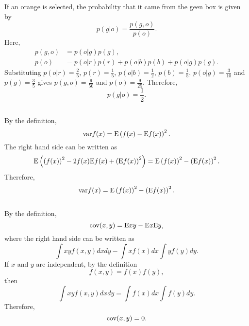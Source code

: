 If an orange is selected, the probability that it came from the geen box is given by
%
\begin{equation}
p(g | o) = \frac{p(g, o)}{p(o)}.
\end{equation}
%
Here,
%
\begin{equation}
\begin{aligned}
p(g, o) &= p(o | g) p(g), \\
p(o) & = p(o | r) p(r) + p(o | b) p(b) + p(o | g) p(g).
\end{aligned}
\end{equation}
%
Substituting $p(o | r) = \frac{2}{5}$, $p(r) = \frac{1}{5}$, $p(o | b) = \frac{1}{2}$, $p(b) = \frac{1}{5}$, $p(o | g) = \frac{3}{10}$ and $p(g) = \frac{3}{5}$ gives $p(g, o) = \frac{9}{50}$ and $p(o) = \frac{9}{25}$.
%
Therefore,
\begin{equation}
p(g | o) = \frac{1}{2}.
\end{equation}




\subsection{}
By the definition, 
%
\begin{equation}
{\rm var} f(x) = {\rm E} \left( f(x) - {\rm E} f(x) \right) ^ 2.
\end{equation}
%
The right hand side can be written as 
%
\begin{equation}
{\rm E} \left( \left( f(x) \right) ^ 2 - 2 f(x) {\rm E} f(x) + \left( {\rm E} f(x) \right) ^ 2 \right) = {\rm E} \left( f(x) \right) ^ 2 - \left( {\rm E} f(x) \right) ^ 2.
\end{equation}
%
Therefore, 
%
\begin{equation}
{\rm var} f(x) = {\rm E} \left( f(x) \right) ^ 2 - \left( {\rm E} f(x) \right) ^ 2.
\end{equation}
%


\subsection{}
By the definition,
%
\begin{equation}
{\rm cov} (x, y) = {\rm E} xy - {\rm E} x {\rm E} y,
\end{equation}
%
where the right hand side can be written as
%
\begin{equation}
\int xy f(x, y) dx dy - \int x f(x) dx \int y f(y) dy.
\end{equation}
%
If $x$ and $y$ are independent, by the definition
%
\begin{equation}
f(x, y) = f(x) f(y),
\end{equation}
%
then
%
\begin{equation}
\int xy f(x, y) dx dy = \int f(x) dx \int f(y) dy.
\end{equation}
%
Therefore,
%
\begin{equation}
{\rm cov} (x, y) = 0.
\end{equation}
%



